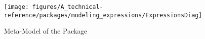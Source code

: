%
%

\begin{figure}[htb]
  \centering
  \texttt{[image: figures/A\_technical-reference/packages/modeling\_expressions/ExpressionsDiag]}
  \caption{Meta-Model of the  Package}
  \label{fig:MM:expressions}
\end{figure}
